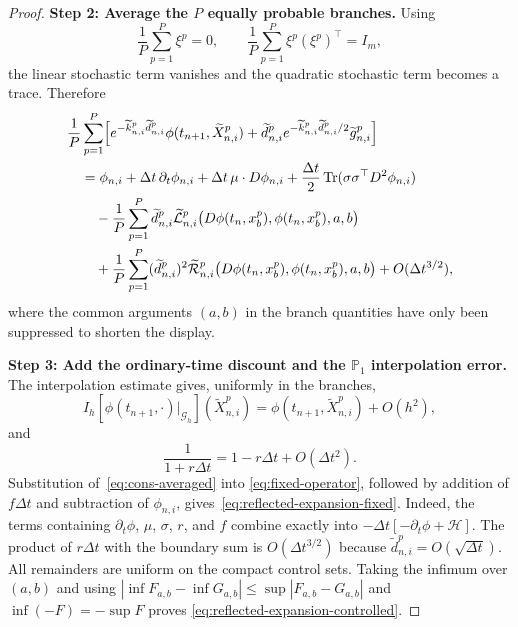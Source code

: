 \documentclass[10pt,a4paper]{amsart}
\newcommand{\cG}{\mathcal{G}}
\newcommand{\Tr}{\operatorname{Tr}}
\begin{document}
\begin{proof}
		\medskip
		\noindent\textbf{Step 2: Average the $P$ equally probable branches.}
		Using
		\[
		\frac1P\sum_{p=1}^P\xi^p=0,
		\qquad
		\frac1P\sum_{p=1}^P\xi^p(\xi^p)^\top=I_m,
		\]
		the linear stochastic term vanishes and the quadratic stochastic term
		becomes a trace.  Therefore
		\begin{align}
			&\frac1P\sum_{p=1}^P\Bigl[
			e^{-\widetilde k_{n,i}^p\widetilde d_{n,i}^p}
			\phi(t_{n+1},\widetilde X_{n,i}^p)
			+\widetilde d_{n,i}^p
			e^{-\widetilde k_{n,i}^p\widetilde d_{n,i}^p/2}
			\widetilde g_{n,i}^p\Bigr]
			\notag\\
			&\quad=\phi_{n,i}+\Delta t\,\partial_t\phi_{n,i}
			+\Delta t\,\mu\cdot D\phi_{n,i}
			+\frac{\Delta t}{2}\Tr(\sigma\sigma^\top D^2\phi_{n,i})
			\notag\\
			&\qquad-\frac1P\sum_{p=1}^P\widetilde d_{n,i}^p
			\widetilde{\mathcal L}_{n,i}^p
			\bigl(D\phi(t_n,x_b^p),\phi(t_n,x_b^p),a,b\bigr)
			\notag\\
			&\qquad+\frac1P\sum_{p=1}^P(\widetilde d_{n,i}^p)^2
			\widetilde{\mathcal R}_{n,i}^p
			\bigl(D\phi(t_n,x_b^p),\phi(t_n,x_b^p),a,b\bigr)
			+O(\Delta t^{3/2}),
			\label{eq:cons-averaged}
		\end{align}
		where the common arguments $(a,b)$ in the branch quantities have only been
		suppressed to shorten the display.
		
		\medskip
		\noindent\textbf{Step 3: Add the ordinary-time discount and the
			$\mathbb P_1$ interpolation error.}
		The interpolation estimate gives, uniformly in the branches,
		\[
		I_h[\phi(t_{n+1},\cdot)|_{\cG_h}](\widetilde X_{n,i}^p)
		=\phi(t_{n+1},\widetilde X_{n,i}^p)+O(h^2),
		\]
		and
		\[
		\frac1{1+r\Delta t}=1-r\Delta t+O(\Delta t^2).
		\]
		Substitution of~\eqref{eq:cons-averaged} into
		\eqref{eq:fixed-operator}, followed by addition of $f\Delta t$ and
		subtraction of $\phi_{n,i}$, gives~\eqref{eq:reflected-expansion-fixed}.
		Indeed, the terms containing $\partial_t\phi$, $\mu$, $\sigma$, $r$, and
		$f$ combine exactly into $-\Delta t[-\partial_t\phi+\mathcal H]$.
		The product of $r\Delta t$ with the boundary sum is
		$O(\Delta t^{3/2})$ because
		$\widetilde d_{n,i}^p=O(\sqrt{\Delta t})$.
		All remainders are uniform on the compact control sets.  Taking the infimum
		over $(a,b)$ and using
		\(
		|\inf F_{a,b}-\inf G_{a,b}|\le\sup|F_{a,b}-G_{a,b}|
		\)
		and $\inf(-F)=-\sup F$ proves
		\eqref{eq:reflected-expansion-controlled}.
		

\end{proof}
\end{document}
